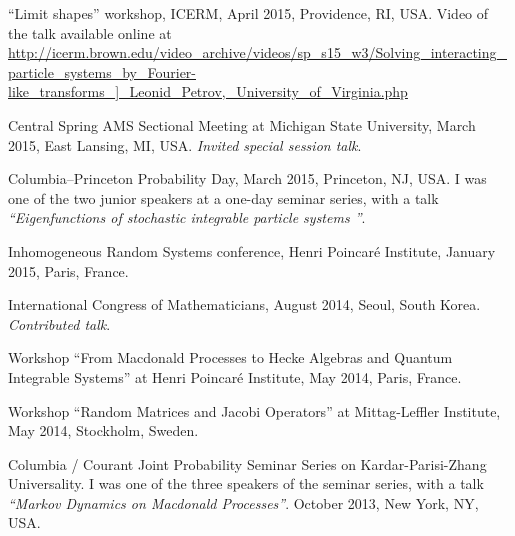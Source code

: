 \documentclass[letterpaper,11pt]{article}
\begin{document}
\begin{etaremune}




\item ``Limit shapes'' workshop, ICERM, April 2015, Providence, RI, USA. Video of the talk available 
online at 
\url{http://icerm.brown.edu/video_archive/videos/sp_s15_w3/Solving_interacting_particle_systems_by_Fourier-like_transforms_]_Leonid_Petrov,_University_of_Virginia.php}

\item Central Spring AMS Sectional Meeting at Michigan State University, March 2015, East Lansing, MI, USA. \emph{Invited special session talk}.

\item Columbia--Princeton Probability Day, March 2015, Princeton, NJ, USA.
I was one of the two junior speakers at a one-day seminar series,
with a talk \emph{``Eigenfunctions of stochastic integrable particle systems
''}.

\item Inhomogeneous Random Systems conference, Henri Poincar\'e Institute, January 2015, Paris, France.

\item International Congress of Mathematicians, August 2014, 
Seoul, South Korea. \emph{Contributed talk}.

\item Workshop 
``From Macdonald Processes to Hecke Algebras and Quantum Integrable Systems''
at Henri Poincar\'e Institute,
May 2014, Paris, France.

\item 
Workshop
``Random Matrices and Jacobi Operators''
at 
Mittag-Leffler Institute,
May 2014, Stockholm, Sweden.

\item
Columbia / Courant Joint Probability Seminar Series on Kardar-Parisi-Zhang Universality. 
I was one of the three speakers of the seminar series,
with a talk
\emph{``Markov Dynamics on Macdonald Processes''}.
October 2013, New York, NY, USA.


\end{etaremune}
\end{document}
